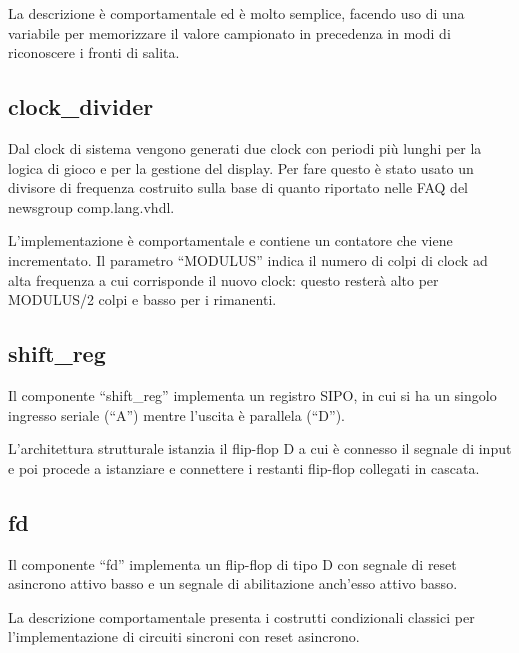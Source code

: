 \documentclass [11pt,a4paper,oneside,draft]{article}
\begin{document}


La descrizione è comportamentale ed è molto semplice, facendo uso di
una variabile per memorizzare il valore campionato in precedenza in
modi di riconoscere i fronti di salita.



\subsection{clock\_divider}

Dal clock di sistema vengono generati due clock con periodi più
lunghi per la logica di gioco e per la gestione del display.
Per fare questo è stato usato un divisore di frequenza costruito
sulla base di quanto riportato nelle FAQ del newsgroup
comp.lang.vhdl.



L'implementazione è comportamentale e contiene un contatore che viene
incrementato. Il parametro ``MODULUS'' indica il numero di colpi di
clock ad alta frequenza a cui corrisponde il nuovo clock: questo
resterà alto per MODULUS/2 colpi e basso per i rimanenti.



\subsection{shift\_reg}

Il componente ``shift\_reg'' implementa un registro SIPO, in cui
si ha un singolo ingresso seriale (``A'') mentre l'uscita è
parallela (``D'').



L'architettura strutturale istanzia il flip-flop D a cui è connesso
il segnale di input e poi procede a istanziare e connettere i restanti
flip-flop collegati in cascata.



\subsection{fd}

Il componente ``fd'' implementa un flip-flop di tipo D con segnale di
reset asincrono attivo basso e un segnale di abilitazione anch'esso
attivo basso.



La descrizione comportamentale presenta i costrutti condizionali
classici per l'implementazione di circuiti sincroni con reset asincrono.


\end{document}
